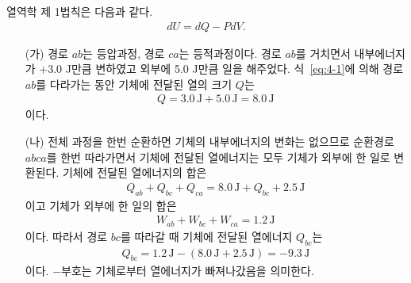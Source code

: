 \documentclass[floatfix,nofootinbib,superscriptaddress,fleqn]{revtex4-2}
\begin{document}
\vspace{1.cm}
열역학 제 1법칙은 다음과 같다.
\begin{align}\label{eq:4-1}
  dU = dQ -PdV.
\end{align}
\begin{itemize}
  \item[(가)]
  경로 $ab$는 등압과정, 경로 $ca$는 등적과정이다. 경로 $ab$를 거치면서 내부에너지가 
+3.0 J만큼 변하였고 외부에 5.0 J만큼 일을 해주었다. 식~\eqref{eq:4-1}에 의해 경로 $ab$를
다라가는 동안 기체에 전달된 열의 크기 $Q$는
\begin{align}
  Q = 3.0\,\mathrm{J} + 5.0\,\mathrm{J} 
  =8.0\,\mathrm{J}
\end{align}
이다. 
  \item[(나)] 전체 과정을 한번 순환하면 기체의 내부에너지의 변화는 없으므로  
  순환경로 $abca$를 한번 따라가면서 기체에 전달된 열에너지는 모두 기체가 외부에
  한 일로 변환된다. 기체에 전달된 열에너지의 합은
  \begin{align}
    Q_{ab}+Q_{bc}+Q_{ca} = 8.0\,\mathrm{J} +Q_{bc}+2.5\,\mathrm{J}
  \end{align}
  이고 기체가 외부에 한 일의 합은
  \begin{align}
    W_{ab}+W_{bc}+W_{ca} = 1.2\,\mathrm{J}
  \end{align}
  이다. 따라서 경로 $bc$를 따라갈 때 기체에 전달된 열에너지 $Q_{bc}$는
  \begin{align}
    Q_{bc} = 1.2\,\mathrm{J} - (8.0\,\mathrm{J} +2.5\,\mathrm{J})
    =-9.3\,\mathrm{J}
  \end{align}
  이다. $-$부호는 기체로부터 열에너지가 빠져나갔음을 의미한다.
\end{itemize}
\end{document}
